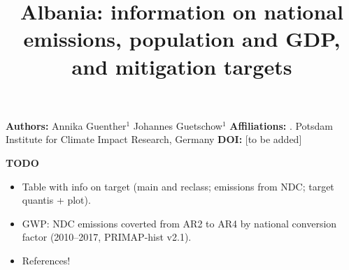 \documentclass[12pt]{article}
\title{ \bfseries \color{PIKorange} Albania: information on national emissions, population and GDP, and mitigation targets}
\begin{document}
 \maketitle

 \noindent \textbf{Authors:} \newline
 \indent Annika Guenther$^{1}$ \newline
 \indent Johannes Guetschow$^{1}$ \newline
 \noindent \textbf{Affiliations:} \newline
 . Potsdam Institute for Climate Impact Research, Germany \newline
 \noindent \textbf{DOI:} [to be added] \newline

 \textbf{TODO}
 \begin{itemize}
 \item Table with info on target (main and reclass; emissions from NDC; target quantis + plot).
 \item GWP: NDC emissions coverted from AR2 to AR4 by national conversion factor (2010--2017, PRIMAP-hist v2.1).
 \item References!
 \end{itemize}

\end{document}

